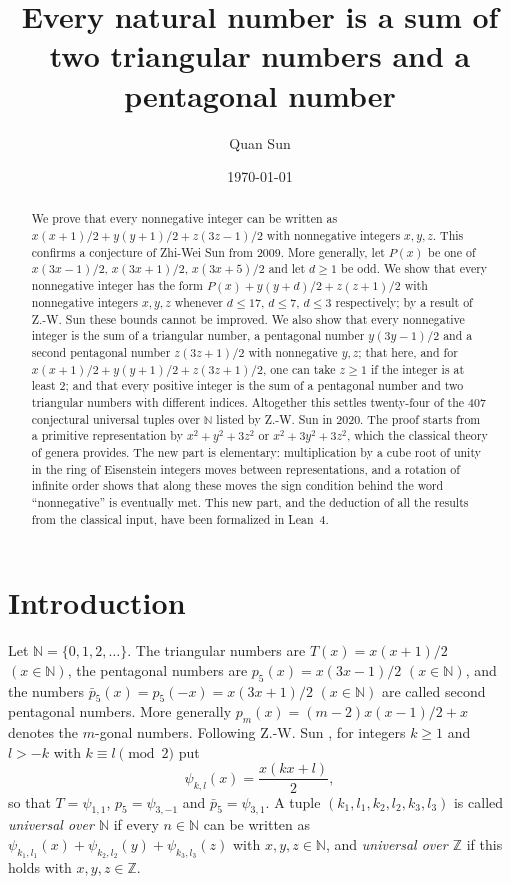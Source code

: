 \documentclass[11pt]{amsart}
\title[Two triangular numbers and a pentagonal number]{Every natural number is a sum of two triangular numbers and a pentagonal number}
\author{Quan Sun}
\date{\today}
\theoremstyle{definition}
\theoremstyle{remark}
\newcommand{\N}{\mathbb{N}}
\newcommand{\Z}{\mathbb{Z}}
\newcommand{\pb}{\bar p_5}
\newcommand{\Tr}{T}
\begin{document}
\begin{abstract}
We prove that every nonnegative integer can be written as
$x(x+1)/2+y(y+1)/2+z(3z-1)/2$ with nonnegative integers $x,y,z$.
This confirms a conjecture of Zhi-Wei Sun from 2009.
More generally, let $P(x)$ be one of $x(3x-1)/2$, $x(3x+1)/2$, $x(3x+5)/2$ and let $d\ge 1$ be odd.
We show that every nonnegative integer has the form $P(x)+y(y+d)/2+z(z+1)/2$ with nonnegative integers $x,y,z$
whenever $d\le 17$, $d\le 7$, $d\le 3$ respectively; by a result of Z.-W. Sun these bounds cannot be improved.
We also show that every nonnegative integer is the sum of a triangular number,
a pentagonal number $y(3y-1)/2$ and a second pentagonal number $z(3z+1)/2$ with nonnegative $y,z$;
that here, and for $x(x+1)/2+y(y+1)/2+z(3z+1)/2$, one can take $z\ge 1$ if the integer is at least $2$;
and that every positive integer is the sum of a pentagonal number and two triangular numbers with different indices.
Altogether this settles twenty-four of the $407$ conjectural universal tuples over $\N$ listed by Z.-W. Sun in 2020.
The proof starts from a primitive representation by $x^2+y^2+3z^2$ or $x^2+3y^2+3z^2$, which the classical
theory of genera provides. The new part is elementary: multiplication by a cube root of unity in the ring of
Eisenstein integers moves between representations, and a rotation of infinite order shows that along these moves
the sign condition behind the word ``nonnegative'' is eventually met.
This new part, and the deduction of all the results from the classical input, have been formalized in Lean~4.
\end{abstract}

\maketitle

\section{Introduction}

Let $\N=\{0,1,2,\dots\}$. The triangular numbers are $\Tr(x)=x(x+1)/2$ $(x\in\N)$,
the pentagonal numbers are $p_5(x)=x(3x-1)/2$ $(x\in\N)$, and the numbers
$\pb(x)=p_5(-x)=x(3x+1)/2$ $(x\in\N)$ are called second pentagonal numbers.
More generally $p_m(x)=(m-2)x(x-1)/2+x$ denotes the $m$-gonal numbers.
Following Z.-W. Sun \cite{S20}, for integers $k\ge 1$ and $l>-k$ with $k\equiv l\pmod 2$ put
\[
\psi_{k,l}(x)=\frac{x(kx+l)}{2},
\]
so that $\Tr=\psi_{1,1}$, $p_5=\psi_{3,-1}$ and $\pb=\psi_{3,1}$.
A tuple $(k_1,l_1,k_2,l_2,k_3,l_3)$ is called \emph{universal over $\N$} if every $n\in\N$ can be written as
$\psi_{k_1,l_1}(x)+\psi_{k_2,l_2}(y)+\psi_{k_3,l_3}(z)$ with $x,y,z\in\N$, and \emph{universal over $\Z$}
if this holds with $x,y,z\in\Z$.
\end{document}
